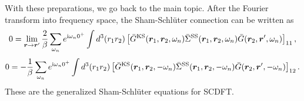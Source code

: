 With these preparations, we go back to the main topic. After the Fourier transform into frequency space,
the Sham-Schl\"{u}ter connection can be written as
%
\begin{equation}
	0 = \lim_{\bm r \to \bm r'} \frac{2}{\beta} \sum_{\omega_n}
	e^{ {\rm i}\omega_n 0^{+}} 
	\int d^3(r_1 r_2) \left[ \bar{G}^{\rm KS}(\bm r_1, \bm r_2, \omega_n)
	\bar{\Sigma }^{\rm SS}(\bm r_1, \bm r_2, \omega_n) \bar{G}(\bm r_2, \bm r', \omega_n)
	\right]_{11},
	\label{eq:AppSSrho}
\end{equation}
%
\begin{equation}
	0 = - \frac{1}{\beta} \sum_{\omega_n}
	e^{ {\rm i}\omega_n 0^{+}} 
	\int d^3(r_1 r_2) \left[ \bar{G}^{\rm KS}(\bm r_1, \bm r_2, -\omega_n)
	\bar{\Sigma }^{\rm SS}(\bm r_1, \bm r_2, -\omega_n) \bar{G}(\bm r_2, \bm r', -\omega_n)
	\right]_{12}.
	\label{eq:AppSSanom}
\end{equation}
%
These are the generalized Sham-Schl\"{u}ter equations for SCDFT.


